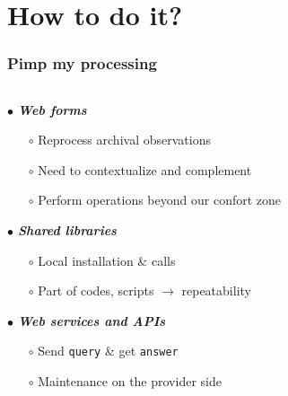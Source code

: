 \section{How to do it?}


\begin{frame}
  \frametitle{Pimp my processing}

  \begin{columns}[T]

    \begin{column}{.6\textwidth}
      \begin{overlayarea}{\textwidth}{\textheight}

        \emph{$\bullet$ \bf Web forms} 
          \begin{itemize}[<.->]
            \item[$\circ$] Reprocess archival observations
            \item[$\circ$] Need to contextualize and complement
            \item[$\circ$] Perform operations beyond our confort zone
          \end{itemize}

        \vspace{1.0em}
        \emph{$\bullet$ \bf Shared libraries} 
          \begin{itemize}[<.->]
            \item[$\circ$] Local installation \& calls
            \item[$\circ$] Part of codes, scripts $\rightarrow$ repeatability
          \end{itemize}

        \vspace{1.0em}
        \emph{$\bullet$ \bf Web services and APIs} 
          \begin{itemize}[<.->]
            \item[$\circ$] Send \texttt{query} \& get \texttt{answer}
            \item[$\circ$] Maintenance on the provider side
          \end{itemize}

      \end{overlayarea}
    \end{column}


    \begin{column}{.4\textwidth}
      \begin{overlayarea}{\textwidth}{\textheight}


\end{overlayarea}
\end{column}
\end{columns}
\end{frame}
